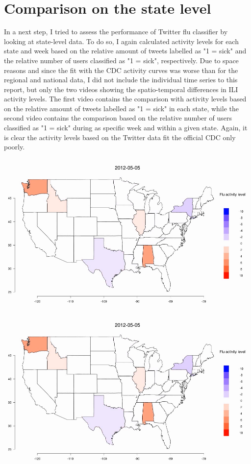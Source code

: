 \documentclass[11pt, a4paper]{report}\usepackage[]{graphicx}\usepackage[]{color}
\begin{document}
\raggedright

\section{Comparison on the state level}
In a next step, I tried to assess the performance of Twitter flu classifier by looking at state-level data. To do so, I again calculated activity levels for each state and week based on the relative amount of tweets labelled as "1 = sick" and the relative number of users classified as "1 = sick", respectively. Due to space reasons and since the fit with the CDC activity curves was worse than for the regional and national data, I did not include the individual time series to this report, but only the two videos showing the spatio-temporal differences in ILI activity levels. The first video contains the comparison with activity levels based on the relative amount of tweets labelled as "1 = sick" in each state, while the second video contains the comparison based on the relative number of users classified as "1 = sick" during as specific week and within a given state. Again, it is clear the activity levels based on the Twitter data fit the official CDC only poorly.\newline

\centering \href{run:vids/state_Twitter_cdc_diff_full_rel_sick.avi}{\includegraphics[scale=0.5]{vids/ScreenshotState.png}} 

\bigskip

\centering \href{run:vids/state_Twitter_cdc_diff_full_rel_sick_user.avi}{\includegraphics[scale=0.5]{vids/ScreenshotState.png}} 
\end{document}
